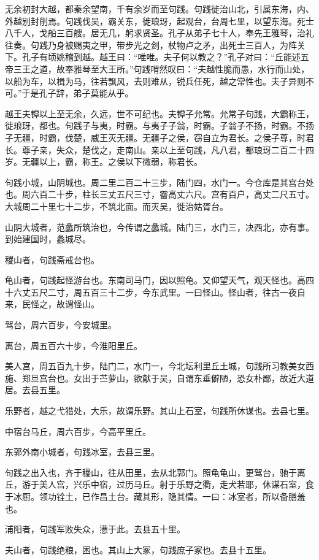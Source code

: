 \documentclass[12pt,UTF8]{ctexbook}
\begin{document}
无余初封大越，都秦余望南，千有余岁而至句践。句践徙治山北，引属东海，内、外越别封削焉。句践伐吴，霸关东，徙琅玡，起观台，台周七里，以望东海。死士八千人，戈船三百艘。居无几，躬求贤圣。孔子从弟子七十人，奉先王雅琴，治礼往奏。句践乃身被赐夷之甲，带步光之剑，杖物卢之矛，出死士三百人，为阵关下。孔子有顷姚稽到越。越王曰：“唯唯。夫子何以教之？”孔子对曰：“丘能述五帝三王之道，故奉雅琴至大王所。”句践喟然叹曰：“夫越性脆而愚，水行而山处，以船为车，以楫为马，往若飘风，去则难从，锐兵任死，越之常性也。夫子异则不可。”于是孔子辞，弟子莫能从乎。

越王夫镡以上至无余，久远，世不可纪也。夫镡子允常。允常子句践，大霸称王，徙琅玡，都也。句践子与夷，时霸。与夷子子翁，时霸。子翁子不扬，时霸。不扬子无疆，时霸，伐楚，威王灭无疆。无疆子之侯，窃自立为君长。之侯子尊，时君长。尊子亲，失众，楚伐之，走南山。亲以上至句践，凡八君，都琅玡二百二十四岁。无疆以上，霸，称王。之侯以下微弱，称君长。

句践小城，山阴城也。周二里二百二十三步，陆门四，水门一。今仓库是其宫台处也。周六百二十步，柱长三丈五尺三寸，霤高丈六尺。宫有百户，高丈二尺五寸。大城周二十里七十二步，不筑北面。而灭吴，徙治姑胥台。

山阴大城者，范蠡所筑治也，今传谓之蠡城。陆门三，水门三，决西北，亦有事。到始建国时，蠡城尽。

稷山者，句践斋戒台也。

龟山者，句践起怪游台也。东南司马门，因以照龟。又仰望天气，观天怪也。高四十六丈五尺二寸，周五百三十二步，今东武里。一曰怪山。怪山者，往古一夜自来，民怪之，故谓怪山。

驾台，周六百步，今安城里。

离台，周五百六十步，今淮阳里丘。

美人宫，周五百九十步，陆门二，水门一，今北坛利里丘土城，句践所习教美女西施、郑旦宫台也。女出于苎萝山，欲献于吴，自谓东垂僻陋，恐女朴鄙，故近大道居。去县五里。

乐野者，越之弋猎处，大乐，故谓乐野。其山上石室，句践所休谋也。去县七里。

中宿台马丘，周六百步，今高平里丘。

东郭外南小城者，句践冰室，去县三里。

句践之出入也，齐于稷山，往从田里，去从北郭门。照龟龟山，更驾台，驰于离丘，游于美人宫，兴乐中宿，过历马丘。射于乐野之衢，走犬若耶，休谋石室，食于冰厨。领功铨土，已作昌土台。藏其形，隐其情。一曰：冰室者，所以备膳羞也。

浦阳者，句践军败失众，懑于此。去县五十里。

夫山者，句践绝粮，困也。其山上大冢，句践庶子冢也。去县十五里。
\end{document}
